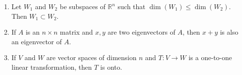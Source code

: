 \documentclass[12pt,letterpaper]{article}
\begin{document}
\begin{enumerate}
\begin{enumerate}
		\item  Let $W_1$ and $W_2$ be subspaces of $\mathbb{R}^n$ such that $\dim(W_1)\leq \dim(W_2)$.  Then $W_1\subset W_2$.
		\item If $A$ is an $n \times n$ matrix and $x, y$ are two eigenvectors of $A$, then $x + y$ is also an eigenvector of $A$.
		\item If $V$ and $W$ are vector spaces of dimension $n$ and $T : V \to W$ is a one-to-one linear transformation, then $T$ is onto.
	\end{enumerate}


\end{enumerate}

\newpage
{}%
\lhead{}
\rhead{}
\thispagestyle{fancy}
\end{document}
